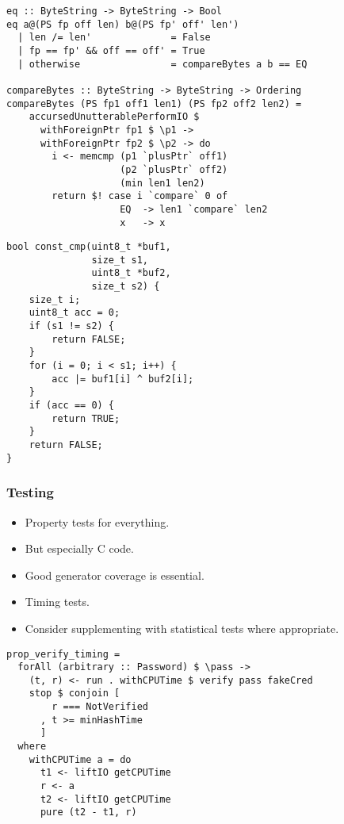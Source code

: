 \documentclass{beamer}
\begin{document}
\begin{frame}[fragile]

\begin{verbatim}
eq :: ByteString -> ByteString -> Bool
eq a@(PS fp off len) b@(PS fp' off' len')
  | len /= len'              = False
  | fp == fp' && off == off' = True
  | otherwise                = compareBytes a b == EQ

compareBytes :: ByteString -> ByteString -> Ordering
compareBytes (PS fp1 off1 len1) (PS fp2 off2 len2) =
    accursedUnutterablePerformIO $
      withForeignPtr fp1 $ \p1 ->
      withForeignPtr fp2 $ \p2 -> do
        i <- memcmp (p1 `plusPtr` off1)
                    (p2 `plusPtr` off2)
                    (min len1 len2)
        return $! case i `compare` 0 of
                    EQ  -> len1 `compare` len2
                    x   -> x
\end{verbatim}

\end{frame}

\begin{frame}[fragile]

\begin{verbatim}
bool const_cmp(uint8_t *buf1,
               size_t s1,
               uint8_t *buf2,
               size_t s2) {
	size_t i;
	uint8_t acc = 0;
	if (s1 != s2) {
		return FALSE;
	}
	for (i = 0; i < s1; i++) {
		acc |= buf1[i] ^ buf2[i];
	}
	if (acc == 0) {
		return TRUE;
	}
	return FALSE;
}
\end{verbatim}

\end{frame}

\begin{frame}

\frametitle{Testing}

\begin{itemize}
  \item Property tests for everything.
  \item But especially C code.
  \item Good generator coverage is essential.
  \item Timing tests.
  \item Consider supplementing with statistical tests where
    appropriate.
\end{itemize}

\end{frame}

\begin{frame}[fragile]

\begin{verbatim}
prop_verify_timing =
  forAll (arbitrary :: Password) $ \pass ->
    (t, r) <- run . withCPUTime $ verify pass fakeCred
    stop $ conjoin [
        r === NotVerified
      , t >= minHashTime
      ]
  where
    withCPUTime a = do
      t1 <- liftIO getCPUTime
      r <- a
      t2 <- liftIO getCPUTime
      pure (t2 - t1, r)
\end{verbatim}

\end{frame}
\end{document}
